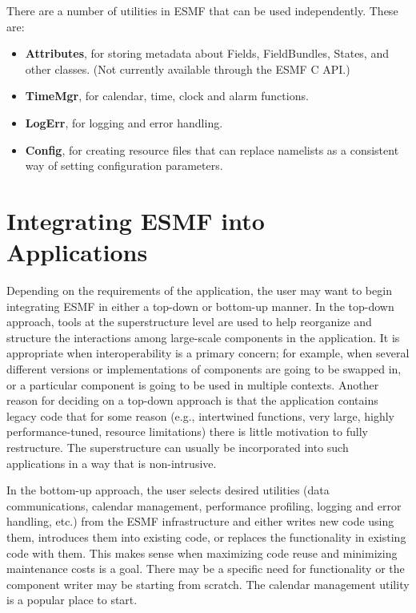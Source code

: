 There are a number of utilities in ESMF that can be used independently.
These are:
\begin{itemize}
\item {\bf Attributes}, for storing metadata about Fields,
FieldBundles, States, and other classes.
(Not currently available through the ESMF C API.)
\item {\bf TimeMgr}, for calendar, time, clock and alarm functions.
\item {\bf LogErr}, for logging and error handling.
\item {\bf Config}, for creating resource files that can replace namelists
as a consistent way of setting configuration parameters.
\end{itemize}

\section{Integrating ESMF into Applications}

Depending on the requirements of the application, the user may 
want to begin integrating ESMF in either a top-down or bottom-up 
manner.  In the top-down approach, tools at the superstructure 
level are used to help reorganize and structure the interactions
among large-scale components in the application.  It is appropriate
when interoperability is a primary concern; for example, when 
several different versions or implementations of components are going 
to be swapped in, or a particular component is going to be used 
in multiple contexts.  Another reason for deciding on a top-down 
approach is that the application contains legacy code that for 
some reason (e.g., intertwined functions, very large,
highly performance-tuned, resource limitations) there is little 
motivation to fully restructure.  The superstructure can usually be 
incorporated into such applications in a way that is non-intrusive.

In the bottom-up approach, the user selects desired utilities 
(data communications, calendar management, performance profiling,
logging and error handling, etc.) from the ESMF infrastructure 
and either writes new code using them, introduces them into 
existing code, or replaces the functionality in existing code 
with them.  This makes sense when maximizing code reuse and 
minimizing maintenance costs is a goal.  There may be a specific
need for functionality or the component writer may be starting
from scratch.  The calendar management utility is a popular
place to start.

